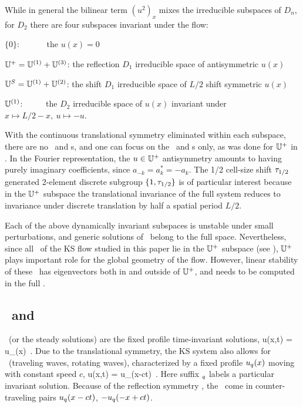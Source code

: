 While in general the bilinear term $(u^2)_x$  mixes the
irreducible subspaces of $D_n$, for $D_2$ there are
four subspaces invariant under the flow:
\begin{romannum}
 \item[$\{0\}$:~~~~~~] the $u(x)=0$ {\eqv}
 \item[$\mathbb{U}^+ = \mathbb{U}^{(1)}+ \mathbb{U}^{(3)} $:]
    the reflection $D_1$ irreducible space of antisymmetric $u(x)$
 \item[$\mathbb{U}^S =  \mathbb{U}^{(1)}+ \mathbb{U}^{(2)}$:]
    the shift $D_1$ irreducible space of $L/2$ shift symmetric  $u(x)$
 \item[$\mathbb{U}^{(1)}$:~~~~~]
    the $D_2$ irreducible  space of $u(x)$ invariant under $x\mapsto L/2-x,\ u\mapsto -u$.
\end{romannum}
With the continuous
translational symmetry eliminated within each subspace, there are no
\reqva\ and \rpo s, and one
can focus on the \eqva\ and \po s only, as was done
for $\mathbb{U}^+$ in .
In the Fourier
representation, the
$u \in \mathbb{U}^+$
antisymmetry amounts to having purely imaginary
coefficients, since $a_{-k}= a^\ast_k = -a_k$.
The 1/2 cell-size shift $\tau_{1/2}$
generated 2-element discrete subgroup
$\{1,\tau_{1/2}\}$ is
of particular interest
because in the $\mathbb{U}^+$ subspace the translational invariance of the full system reduces to
invariance under discrete translation  by half a
spatial period $L/2$.

Each of the above dynamically invariant subspaces is unstable
under small perturbations, and generic solutions of \KSe\ belong to
the full space.
Nevertheless, since  all \eqva\ of the KS flow studied in this paper
lie in the $\mathbb{U}^+$ subspace (see
), $\mathbb{U}^+$  plays important role for the global
geometry of the flow.
However, linear stability of these \eqva\ has
eigenvectors both in and outside of $\mathbb{U}^+$, and needs to be
computed in the full \statesp.




\subsection{\Eqva\ and \reqva}
\label{sec:stks}

\Eqva\  (or the steady solutions)
are the fixed profile time-invariant solutions,
\beq
 u(x,t) = u_\stagn(x)
\,.
Due to the translational symmetry,
the KS system also allows for
\reqva\ (traveling waves, rotating waves),
characterized by a fixed profile $u_q(x)$
moving with constant speed $c$, {\ie}
\beq
 u(x,t) =  u_\stagn(x-ct)
\,.
Here suffix ${}_q$ labels a particular invariant solution.
Because of the reflection symmetry ,
the \reqva\ come in counter-traveling pairs
$u_q(x-ct)$, $-u_q(-x+ct)$.

